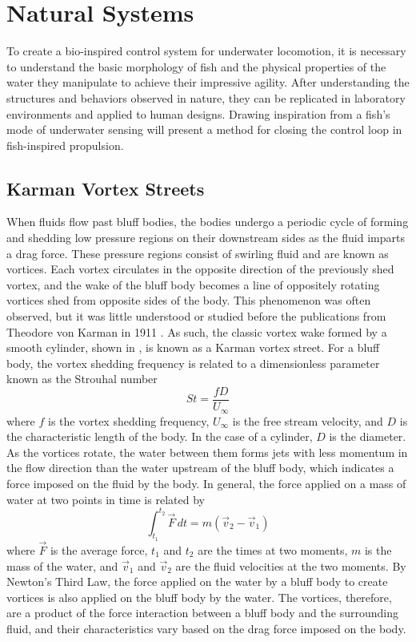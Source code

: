 \clearpage
\section{Natural Systems} \label{Natural Systems}

    To create a bio-inspired control system for underwater locomotion, it is necessary to understand the basic morphology of fish and the physical properties of the water they manipulate to achieve their impressive agility. After understanding the structures and behaviors observed in  nature, they can be replicated in laboratory environments and applied to human designs. Drawing inspiration from a fish's mode of underwater sensing will present a method for closing the control loop in fish-inspired propulsion.

\subsection{Karman Vortex Streets} \label{Karman Vortex Streets}

    When fluids flow past bluff bodies, the bodies undergo a periodic cycle of forming and shedding low pressure regions on their downstream sides as the fluid imparts a drag force. These pressure regions consist of swirling fluid and are known as vortices. Each vortex circulates in the opposite direction of the previously shed vortex, and the wake of the bluff body becomes a line of oppositely rotating vortices shed from opposite sides of the body. This phenomenon was often observed, but it was little understood or studied before the publications from Theodore von Karman in 1911 \citep{Karman1911}. As such, the classic vortex wake formed by a smooth cylinder, shown in , is known as a Karman vortex street. For a bluff body, the vortex shedding frequency is related to a dimensionless parameter known as the Strouhal number 
    \begin{equation} \label{Eq:Karman St}
    St=\frac{fD}{U_\infty}
    \end{equation} 
    where \(f\) is the vortex shedding frequency, \(U_\infty\) is the free stream velocity, and \(D\) is the characteristic length of the body. In the case of a cylinder, \(D\) is the diameter. As the vortices rotate, the water between them forms jets with less momentum in the flow direction than the water upstream of the bluff body, which indicates a force imposed on the fluid by the body. In general, the force applied on a mass of water at two points in time is related by \[\int_{t_1}^{t_2} \vec F \, dt=m(\vec v_2-\vec v_1)\] where \(\vec F\) is the average force, \(t_1\) and \(t_2\) are the times at two moments, \(m\) is the mass of the water, and \(\vec v_1\) and \(\vec v_2\) are the fluid velocities at the two moments. By Newton's Third Law, the force applied on the water by a bluff body to create vortices is also applied on the bluff body by the water. The vortices, therefore, are a product of the force interaction between a bluff body and the surrounding fluid, and their characteristics vary based on the drag force imposed on the body.

